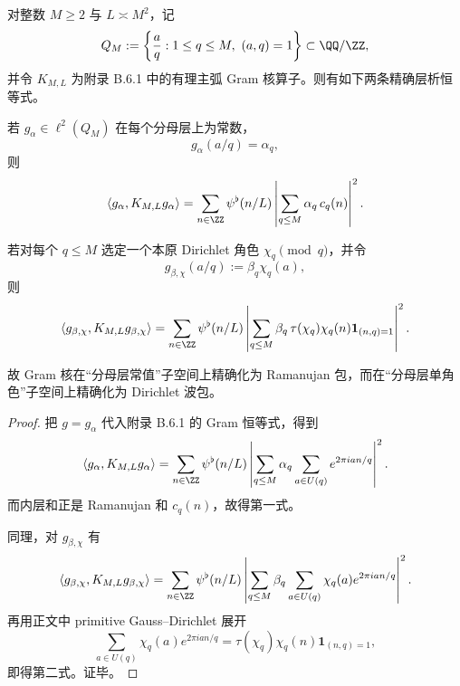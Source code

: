 \begin{theorem}\label{thm:conclusion-majorarc-gram-ramanujan-dirichlet-doublepacket}
对整数 \(M\ge 2\) 与 \(L\asymp M^2\)，记
\[
Q_M:=\left\{\frac{a}{q}:1\le q\le M,\ (a,q)=1\right\}\subset \QQ/\ZZ,
\]
并令 \(K_{M,L}\) 为附录 B.6.1 中的有理主弧 Gram 核算子。则有如下两条精确层析恒等式。

若 \(g_\alpha\in \ell^2(Q_M)\) 在每个分母层上为常数，
\[
g_\alpha(a/q)=\alpha_q,
\]
则
\[
\langle g_\alpha,K_{M,L}g_\alpha\rangle
=
\sum_{n\in\ZZ}\psi^{\flat}(n/L)
\left|
\sum_{q\le M}\alpha_q\,c_q(n)
\right|^2.
\]

若对每个 \(q\le M\) 选定一个本原 Dirichlet 角色 \(\chi_q\pmod q\)，并令
\[
g_{\beta,\chi}(a/q):=\beta_q\chi_q(a),
\]
则
\[
\langle g_{\beta,\chi},K_{M,L}g_{\beta,\chi}\rangle
=
\sum_{n\in\ZZ}\psi^{\flat}(n/L)
\left|
\sum_{q\le M}\beta_q\,\tau(\chi_q)\chi_q(n)\mathbf 1_{(n,q)=1}
\right|^2.
\]

故 Gram 核在“分母层常值”子空间上精确化为 Ramanujan 包，而在“分母层单角色”子空间上精确化为 Dirichlet 波包。
\end{theorem}
\begin{proof}
把 \(g=g_\alpha\) 代入附录 B.6.1 的 Gram 恒等式，得到
\[
\langle g_\alpha,K_{M,L}g_\alpha\rangle
=
\sum_{n\in\ZZ}\psi^{\flat}(n/L)
\left|
\sum_{q\le M}\alpha_q
\sum_{a\in U(q)}e^{2\pi ian/q}
\right|^2.
\]
而内层和正是 Ramanujan 和 \(c_q(n)\)，故得第一式。

同理，对 \(g_{\beta,\chi}\) 有
\[
\langle g_{\beta,\chi},K_{M,L}g_{\beta,\chi}\rangle
=
\sum_{n\in\ZZ}\psi^{\flat}(n/L)
\left|
\sum_{q\le M}\beta_q
\sum_{a\in U(q)}\chi_q(a)e^{2\pi ian/q}
\right|^2.
\]
再用正文中 primitive Gauss--Dirichlet 展开
\[
\sum_{a\in U(q)}\chi_q(a)e^{2\pi ian/q}
=
\tau(\chi_q)\chi_q(n)\mathbf 1_{(n,q)=1},
\]
即得第二式。证毕。
\end{proof}


